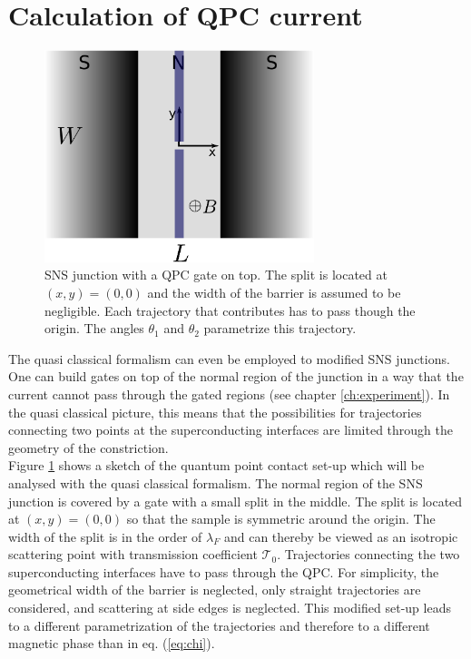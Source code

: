 \section{Calculation of QPC current}
\begin{figure}
\centering
\includegraphics[width=0.7\textwidth]{figure/analyticalmodel/qpc_sns_junction}
\caption{SNS junction with a QPC gate on top. The split is located at $(x, y) = (0, 0)$ and the width of the barrier is assumed to be negligible. Each trajectory that contributes has to pass though the origin. The angles $\theta_1$ and $\theta_2$ parametrize this trajectory.}
\label{fig:qpc_sns_schematic}
\end{figure}
The quasi classical formalism can even be employed to modified SNS junctions. One can build gates on top of the normal region of the junction in a way that the current cannot pass through the gated regions (see chapter \ref{ch:experiment}). In the quasi classical picture, this means that the possibilities for trajectories connecting two points at the superconducting interfaces are limited through the geometry of the constriction.\\
Figure \ref{fig:qpc_sns_schematic} shows a sketch of the quantum point contact set-up which will be analysed with the quasi classical formalism. The normal region of the SNS junction is covered by a gate with a small split in the middle. The split is located at $(x, y) = (0, 0)$ so that the sample is symmetric around the origin. The width of the split is in the order of $\lambda_F$  and can thereby be viewed as an isotropic scattering point with transmission coefficient $\mathcal{T}_0$. Trajectories connecting the two superconducting interfaces have to pass through the QPC. For simplicity, the geometrical width of the barrier is neglected, only straight trajectories are considered, and scattering at side edges is neglected. This modified set-up leads to a different parametrization of the trajectories and therefore to a different magnetic phase than in eq. (\ref{eq:chi}).\\
